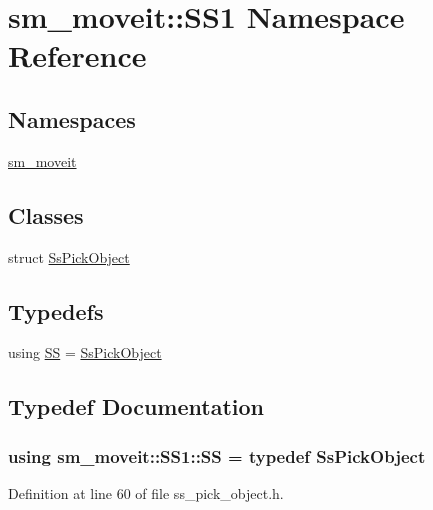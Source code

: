 \hypertarget{namespacesm__moveit_1_1SS1}{}\section{sm\+\_\+moveit\+:\+:S\+S1 Namespace Reference}
\label{namespacesm__moveit_1_1SS1}
\subsection*{Namespaces}
\begin{DoxyCompactItemize}
\item 
 \hyperlink{namespacesm__moveit_1_1SS1_1_1sm__moveit}{sm\+\_\+moveit}
\end{DoxyCompactItemize}
\subsection*{Classes}
\begin{DoxyCompactItemize}
\item 
struct \hyperlink{structsm__moveit_1_1SS1_1_1SsPickObject}{Ss\+Pick\+Object}
\end{DoxyCompactItemize}
\subsection*{Typedefs}
\begin{DoxyCompactItemize}
\item 
using \hyperlink{namespacesm__moveit_1_1SS1_a82919e558782e44b5fbfed9a58db5203}{SS} = \hyperlink{structsm__moveit_1_1SS1_1_1SsPickObject}{Ss\+Pick\+Object}
\end{DoxyCompactItemize}


\subsection{Typedef Documentation}
\subsubsection[{\texorpdfstring{SS}{SS}}]{\setlength{\rightskip}{0pt plus 5cm}using {\bf sm\+\_\+moveit\+::\+S\+S1\+::\+SS} = typedef {\bf Ss\+Pick\+Object}}\hypertarget{namespacesm__moveit_1_1SS1_a82919e558782e44b5fbfed9a58db5203}{}\label{namespacesm__moveit_1_1SS1_a82919e558782e44b5fbfed9a58db5203}


Definition at line 60 of file ss\+\_\+pick\+\_\+object.\+h.

